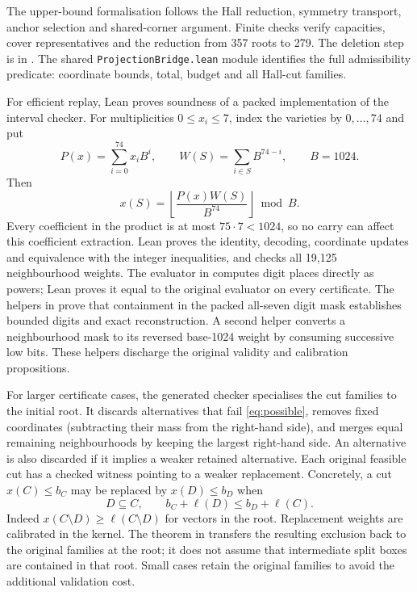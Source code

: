 The upper-bound formalisation follows the Hall reduction, symmetry
transport, anchor selection and shared-corner argument. Finite checks
verify capacities, cover representatives and the reduction from 357 roots
to 279. The deletion step is 
in . The shared
\texttt{ProjectionBridge.lean} module identifies the full admissibility
predicate: coordinate bounds, total, budget and all Hall-cut families.

For efficient replay, Lean proves soundness of a packed implementation of
the interval checker. For multiplicities $0\le x_i\le7$, index the varieties
by $0,\ldots,74$ and put
\[
 P(x)=\sum_{i=0}^{74}x_i B^i,\qquad
 W(S)=\sum_{i\in S}B^{74-i},\qquad B=1024.
\]
Then
\[
 x(S)=\left\lfloor\frac{P(x)W(S)}{B^{74}}\right\rfloor\bmod B.
\]
Every coefficient in the product is at most $75\cdot7<1024$, so no carry
can affect this coefficient extraction. Lean proves the identity, decoding,
coordinate updates and equivalence with the integer inequalities, and
checks all 19,125 neighbourhood weights. The evaluator in
 computes digit places directly as powers;
Lean proves it equal to the original evaluator on every certificate.
The helpers in  prove that
containment in the packed all-seven digit mask establishes bounded digits
and exact reconstruction. A second helper converts a neighbourhood mask
to its reversed base-1024 weight by consuming successive low bits. These
helpers discharge the original validity and calibration propositions.

For larger certificate cases, the generated checker specialises the cut
families to the initial root. It discards alternatives that fail
\eqref{eq:possible}, removes fixed coordinates (subtracting their mass from
the right-hand side), and merges equal remaining neighbourhoods by keeping
the largest right-hand side. An alternative is also discarded if it implies
a weaker retained alternative. Each original feasible cut has a checked witness
pointing to a weaker replacement. Concretely, a cut $x(C)\le b_C$ may
be replaced by $x(D)\le b_D$ when
\[
 D\subseteq C,\qquad b_C+\ell(D)\le b_D+\ell(C).
\]
Indeed $x(C\setminus D)\ge\ell(C\setminus D)$ for vectors in the root.
Replacement weights are calibrated in the kernel. The theorem  in
 transfers the resulting exclusion back
to the original families at the root; it does not assume that intermediate
split boxes are contained in that root. Small cases retain the original
families to avoid the additional validation cost.

